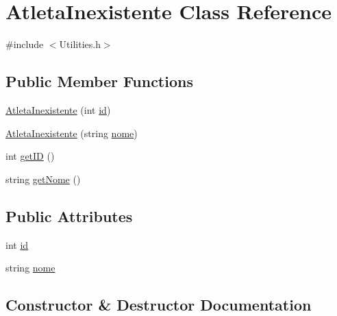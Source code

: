 \hypertarget{class_atleta_inexistente}{}\section{Atleta\+Inexistente Class Reference}
\label{class_atleta_inexistente}


{\ttfamily \#include $<$Utilities.\+h$>$}

\subsection*{Public Member Functions}
\begin{DoxyCompactItemize}
\item 
\hyperlink{class_atleta_inexistente_a82f01d79a4e3b85481549fc13ab2aed1}{Atleta\+Inexistente} (int \hyperlink{class_atleta_inexistente_a61bf65ae48f708dc1b1a8956cccdba72}{id})
\item 
\hyperlink{class_atleta_inexistente_a06c117739c4269b6bda394435db17760}{Atleta\+Inexistente} (string \hyperlink{class_atleta_inexistente_a07d9bf6ff375e2e3e955e73bc6ee93c9}{nome})
\item 
int \hyperlink{class_atleta_inexistente_a24d837c40f615953affaaaa001bd2376}{get\+I\+D} ()
\item 
string \hyperlink{class_atleta_inexistente_a7efbf703023a2ee4435d9b199a470efa}{get\+Nome} ()
\end{DoxyCompactItemize}
\subsection*{Public Attributes}
\begin{DoxyCompactItemize}
\item 
int \hyperlink{class_atleta_inexistente_a61bf65ae48f708dc1b1a8956cccdba72}{id}
\item 
string \hyperlink{class_atleta_inexistente_a07d9bf6ff375e2e3e955e73bc6ee93c9}{nome}
\end{DoxyCompactItemize}


\subsection{Constructor \& Destructor Documentation}
\hypertarget{class_atleta_inexistente_a82f01d79a4e3b85481549fc13ab2aed1}{}
